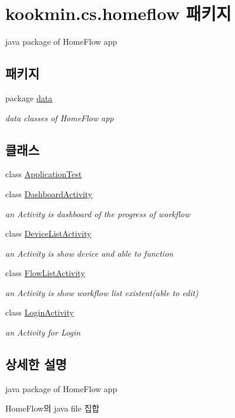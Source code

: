 \hypertarget{namespacekookmin_1_1cs_1_1homeflow}{}\section{kookmin.\+cs.\+homeflow 패키지}
\label{namespacekookmin_1_1cs_1_1homeflow}


java package of Home\+Flow app  


\subsection*{패키지}
\begin{DoxyCompactItemize}
\item 
package \hyperlink{namespacekookmin_1_1cs_1_1homeflow_1_1data}{data}
\begin{DoxyCompactList}\small\item\em data classes of Home\+Flow app \end{DoxyCompactList}\end{DoxyCompactItemize}
\subsection*{클래스}
\begin{DoxyCompactItemize}
\item 
class \hyperlink{classkookmin_1_1cs_1_1homeflow_1_1_application_test}{Application\+Test}
\item 
class \hyperlink{classkookmin_1_1cs_1_1homeflow_1_1_dashboard_activity}{Dashboard\+Activity}
\begin{DoxyCompactList}\small\item\em an Activity is dashboard of the progress of workflow \end{DoxyCompactList}\item 
class \hyperlink{classkookmin_1_1cs_1_1homeflow_1_1_device_list_activity}{Device\+List\+Activity}
\begin{DoxyCompactList}\small\item\em an Activity is show device and able to function \end{DoxyCompactList}\item 
class \hyperlink{classkookmin_1_1cs_1_1homeflow_1_1_flow_list_activity}{Flow\+List\+Activity}
\begin{DoxyCompactList}\small\item\em an Activity is show workflow list existent(able to edit) \end{DoxyCompactList}\item 
class \hyperlink{classkookmin_1_1cs_1_1homeflow_1_1_login_activity}{Login\+Activity}
\begin{DoxyCompactList}\small\item\em an Activity for Login \end{DoxyCompactList}\end{DoxyCompactItemize}


\subsection{상세한 설명}
java package of Home\+Flow app 

Home\+Flow의 java file 집합 